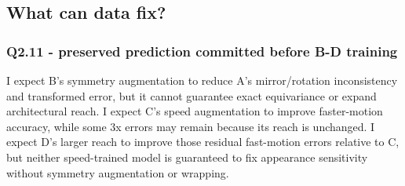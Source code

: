 \documentclass[
  10pt,
  a4paper,
]{article}
\begin{document}
\subsection{What can data fix?}\label{what-can-data-fix}

\subsubsection{Q2.11 - preserved prediction committed before B-D
training}\label{q2.11---preserved-prediction-committed-before-b-d-training}

I expect B's symmetry augmentation to reduce A's mirror/rotation
inconsistency and transformed error, but it cannot guarantee exact
equivariance or expand architectural reach. I expect C's speed
augmentation to improve faster-motion accuracy, while some 3x errors may
remain because its reach is unchanged. I expect D's larger reach to
improve those residual fast-motion errors relative to C, but neither
speed-trained model is guaranteed to fix appearance sensitivity without
symmetry augmentation or wrapping.
\end{document}
